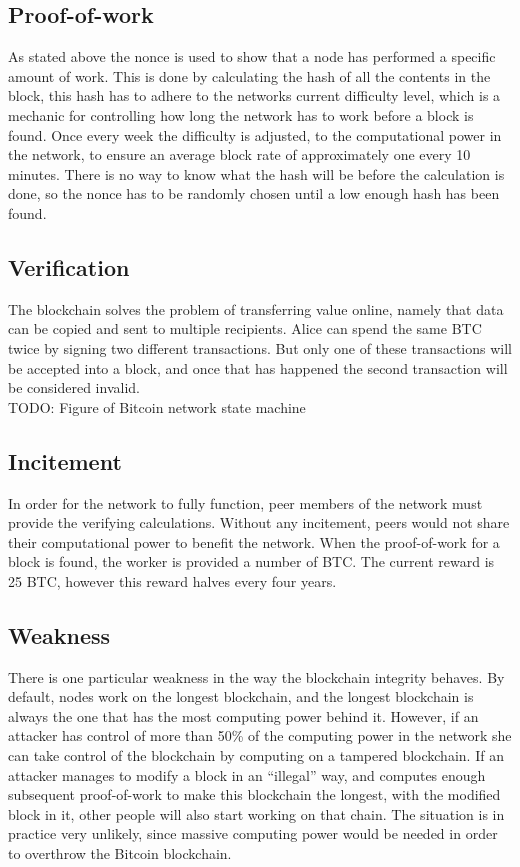 \subsection{Proof-of-work}
As stated above the nonce is used to show that a node has performed a specific amount of work. This is done by calculating the hash of all the contents in the block, this hash has to adhere to the networks current difficulty level, which is a mechanic for controlling how long the network has to work before a block is found. Once every week the difficulty is adjusted, to the computational power in the network, to ensure an average block rate of approximately one every 10 minutes. There is no way to know what the hash will be before the calculation is done, so the nonce has to be randomly chosen until a low enough hash has been found. 

\subsection{Verification}
The blockchain solves the problem of transferring value online, namely that data can be copied and sent to multiple recipients. Alice can spend the same BTC twice by signing two different transactions. But only one of these transactions will be accepted into a block, and once that has happened the second transaction will be considered invalid.
\\TODO: Figure of Bitcoin network state machine

\subsection{Incitement}
In order for the network to fully function, peer members of the network must provide the verifying calculations. Without any incitement, peers would not share their computational power to benefit the network. When the proof-of-work for a block is found,  the worker is provided a number of BTC. The current reward is 25 BTC, however this reward halves every four years. 

\subsection{Weakness}
There is one particular weakness in the way the blockchain integrity behaves. By default, nodes work on the longest blockchain, and the longest blockchain is always the one that has the most computing power behind it. However, if an attacker has control of more than 50\% of the computing power in the network she can take control of the blockchain by computing on a tampered blockchain. If an attacker manages to modify a block in an ``illegal'' way, and computes enough subsequent proof-of-work to make this blockchain the longest, with the modified block in it, other people will also start working on that chain. The situation is in practice very unlikely, since massive computing power would be needed in order to overthrow the Bitcoin blockchain.

